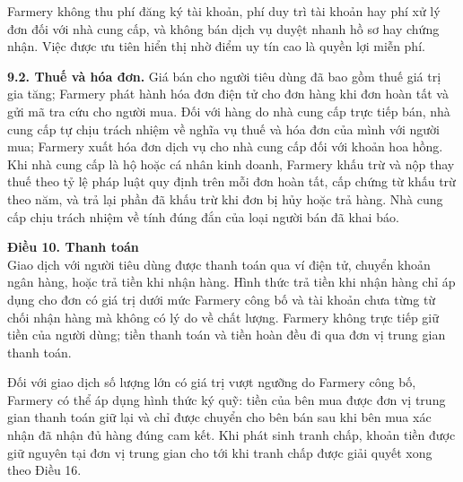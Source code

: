 Farmery không thu phí đăng ký tài khoản, phí duy trì tài khoản hay phí xử lý
đơn đối với nhà cung cấp, và không bán dịch vụ duyệt nhanh hồ sơ hay chứng
nhận. Việc được ưu tiên hiển thị nhờ điểm uy tín cao là quyền lợi miễn phí.

\textbf{9.2. Thuế và hóa đơn.} Giá bán cho người tiêu dùng đã bao gồm thuế giá
trị gia tăng; Farmery phát hành hóa đơn điện tử cho đơn hàng khi đơn hoàn tất
và gửi mã tra cứu cho người mua. Đối với hàng do nhà cung cấp trực tiếp bán,
nhà cung cấp tự chịu trách nhiệm về nghĩa vụ thuế và hóa đơn của mình với
người mua; Farmery xuất hóa đơn dịch vụ cho nhà cung cấp đối với khoản hoa
hồng. Khi nhà cung cấp là hộ hoặc cá nhân kinh doanh, Farmery khấu trừ và nộp
thay thuế theo tỷ lệ pháp luật quy định trên mỗi đơn hoàn tất, cấp chứng từ
khấu trừ theo năm, và trả lại phần đã khấu trừ khi đơn bị hủy hoặc trả hàng.
Nhà cung cấp chịu trách nhiệm về tính đúng đắn của loại người bán đã khai báo.

\noindent\textbf{Điều 10. Thanh toán}\\
Giao dịch với người tiêu dùng được thanh toán qua ví điện tử, chuyển khoản
ngân hàng, hoặc trả tiền khi nhận hàng. Hình thức trả tiền khi nhận hàng chỉ
áp dụng cho đơn có giá trị dưới mức Farmery công bố và tài khoản chưa từng từ
chối nhận hàng mà không có lý do về chất lượng. Farmery không trực tiếp giữ
tiền của người dùng; tiền thanh toán và tiền hoàn đều đi qua đơn vị trung
gian thanh toán.

Đối với giao dịch số lượng lớn có giá trị vượt ngưỡng do Farmery công bố,
Farmery có thể áp dụng hình thức ký quỹ: tiền của bên mua được đơn vị trung
gian thanh toán giữ lại và chỉ được chuyển cho bên bán sau khi bên mua xác
nhận đã nhận đủ hàng đúng cam kết. Khi phát sinh tranh chấp, khoản tiền được
giữ nguyên tại đơn vị trung gian cho tới khi tranh chấp được giải quyết xong
theo Điều 16.

